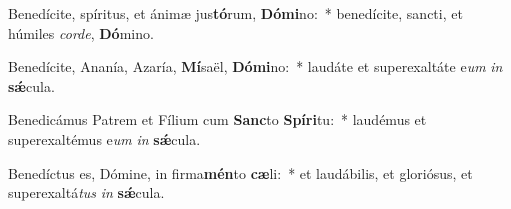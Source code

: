 \item Benedícite, spíritus, et ánimæ jus\textbf{tó}rum, \textbf{Dó}\textbf{mi}no:~* benedícite, sancti, et húmiles \textit{cor}\textit{de}, \textbf{Dó}mino.
\item Benedícite, Ananía, Azaría, \textbf{Mí}saël, \textbf{Dó}\textbf{mi}no:~* laudáte et superexaltáte e\textit{um} \textit{in} \textbf{sǽ}cula.
\item Benedicámus Patrem et Fílium cum \textbf{Sanc}to \textbf{Spí}\textbf{ri}tu:~* laudémus et superexaltémus e\textit{um} \textit{in} \textbf{sǽ}cula.
\item Benedíctus es, Dómine, in firma\textbf{mén}to \textbf{cæ}li:~* et laudábilis, et gloriósus, et superexaltá\textit{tus} \textit{in} \textbf{sǽ}cula.
